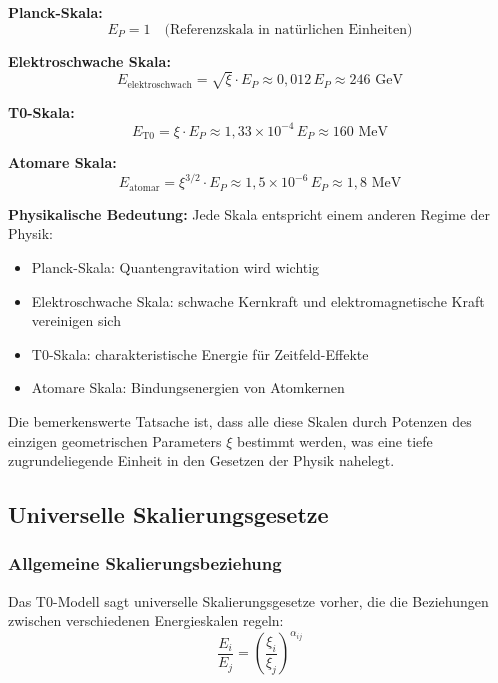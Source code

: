 \documentclass[12pt,a4paper]{article}
\newcommand{\xipar}{\xi}
\begin{document}
	\textbf{Planck-Skala:}
	\begin{equation}
		E_P = 1 \quad \text{(Referenzskala in natürlichen Einheiten)}
	\end{equation}
	
	\textbf{Elektroschwache Skala:}
	\begin{equation}
		E_{\text{elektroschwach}} = \sqrt{\xipar} \cdot E_P \approx 0{,}012 \, E_P \approx 246 \text{ GeV}
	\end{equation}
	
	\textbf{T0-Skala:}
	\begin{equation}
		E_{\text{T0}} = \xipar \cdot E_P \approx 1{,}33 \times 10^{-4} \, E_P \approx 160 \text{ MeV}
	\end{equation}
	
	\textbf{Atomare Skala:}
	\begin{equation}
		E_{\text{atomar}} = \xipar^{3/2} \cdot E_P \approx 1{,}5 \times 10^{-6} \, E_P \approx 1{,}8 \text{ MeV}
	\end{equation}
	
	\textbf{Physikalische Bedeutung:} Jede Skala entspricht einem anderen Regime der Physik:
	\begin{itemize}
		\item Planck-Skala: Quantengravitation wird wichtig
		\item Elektroschwache Skala: schwache Kernkraft und elektromagnetische Kraft vereinigen sich
		\item T0-Skala: charakteristische Energie für Zeitfeld-Effekte
		\item Atomare Skala: Bindungsenergien von Atomkernen
	\end{itemize}
	
	Die bemerkenswerte Tatsache ist, dass alle diese Skalen durch Potenzen des einzigen geometrischen Parameters $\xipar$ bestimmt werden, was eine tiefe zugrundeliegende Einheit in den Gesetzen der Physik nahelegt.
	
	\subsection{Universelle Skalierungsgesetze}
	
	\subsubsection{Allgemeine Skalierungsbeziehung}
	
	Das T0-Modell sagt universelle Skalierungsgesetze vorher, die die Beziehungen zwischen verschiedenen Energieskalen regeln:
	\begin{equation}
		\frac{E_i}{E_j} = \left(\frac{\xipar_i}{\xipar_j}\right)^{\alpha_{ij}}
	\end{equation}
	
\end{document}

